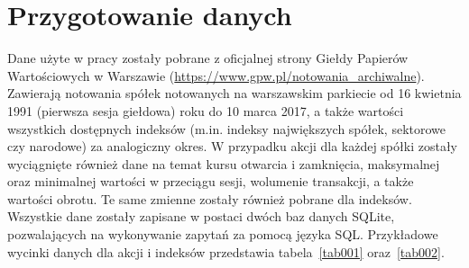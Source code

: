 \documentclass[12pt,a4paper,twoside,openany]{book}
\begin{document}
\section{Przygotowanie danych}
Dane użyte w pracy zostały pobrane z oficjalnej strony Giełdy Papierów Wartościowych w Warszawie (\url{https://www.gpw.pl/notowania_archiwalne}). Zawierają notowania spółek notowanych na warszawskim parkiecie od 16 kwietnia 1991 (pierwsza sesja giełdowa) roku do 10 marca 2017, a także wartości wszystkich dostępnych indeksów (m.in. indeksy największych spółek, sektorowe czy narodowe) za analogiczny okres. W przypadku akcji dla każdej spółki zostały wyciągnięte również dane na temat kursu otwarcia i zamknięcia, maksymalnej oraz minimalnej wartości w przeciągu sesji, wolumenie transakcji, a także wartości obrotu. Te same zmienne zostały również pobrane dla indeksów. Wszystkie dane zostały zapisane w postaci dwóch baz danych SQLite, pozwalających na wykonywanie zapytań za pomocą języka SQL. Przykładowe wycinki danych dla akcji i indeksów przedstawia tabela~\ref{tab001} oraz~\ref{tab002}.

\begin{table}[ht] 
\caption{Losowo wybrane obserwacje z oryginalnego zbioru danych dla notowanych spółek. \textit{Źródło:} \protect\url{https://www.gpw.pl/notowania_archiwalne}}\label{tab001}
\centering
{}
\end{table}
\end{document}
